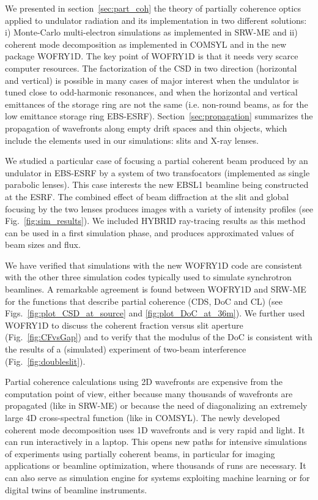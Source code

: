 \documentclass{iucr}              %
\begin{document}
We presented in section~\ref{sec:part_coh} the theory of partially coherence optics applied to undulator radiation and its implementation in two different solutions: i) Monte-Carlo multi-electron simulations as implemented in SRW-ME and ii) coherent mode decomposition as implemented in COMSYL and in the new package WOFRY1D.
The key point of WOFRY1D is that it needs very scarce computer resources.
The factorization of the CSD in two direction (horizontal and vertical) is possible in many cases of major interest when the undulator is tuned close to odd-harmonic resonances, and when the horizontal and vertical emittances of the storage ring are not the same (i.e. non-round beams, as for the low emittance storage ring  EBS-ESRF). 
Section~\ref{sec:propagation} summarizes the propagation of wavefronts along empty drift spaces and thin objects, which include the elements used in our simulations: slits and X-ray lenses. 

We studied a particular case of focusing a partial coherent beam produced by an undulator in EBS-ESRF by a system of two transfocators (implemented as single parabolic lenses). This case interests the new EBSL1 beamline being constructed at the ESRF. The combined effect of beam diffraction at the slit and global focusing by the two lenses produces images with a variety of intensity profiles (see Fig.~\ref{fig:sim_results}). 
We included HYBRID ray-tracing results as this method can be used in a first simulation phase, and produces approximated values of beam sizes and flux.

We have verified that simulations with the new WOFRY1D code are consistent with the other three simulation codes typically used to simulate synchrotron beamlines.
A remarkable agreement is found between WOFRY1D and SRW-ME for the functions that describe partial coherence (CDS, DoC and CL) (see Figs.~\ref{fig:plot_CSD_at_source} and \ref{fig:plot_DoC_at_36m}).
We further used WOFRY1D to discuss the coherent fraction versus slit aperture (Fig.~\ref{fig:CFvsGap}) and to verify that the modulus of the DoC is consistent with the results of a (simulated) experiment of two-beam interference (Fig.~\ref{fig:doubleslit}). 
 
Partial coherence calculations using 2D wavefronts are expensive from the computation point of view, either because many thousands of wavefronts are propagated (like in SRW-ME) or because the need of diagonalizing an extremely large 4D cross-spectral function (like in COMSYL). The newly developed coherent mode decomposition uses 1D wavefronts and is very rapid and light. It can run interactively in a laptop. This opens new paths for intensive simulations of experiments using partially coherent beams, in particular for imaging applications or beamline optimization, where thousands of runs are necessary. It can also serve as simulation engine for systems exploiting machine learning or for digital twins of beamline instruments. 
 
\end{document}
